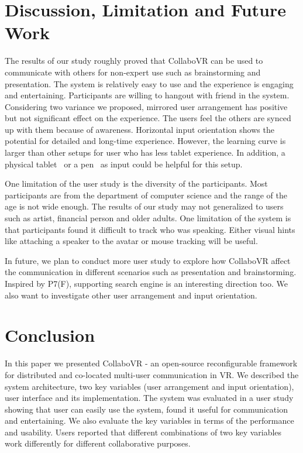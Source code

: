 \documentclass{sigchi}
\begin{document}
\section{Discussion, Limitation and Future Work}
The results of our study roughly proved that CollaboVR can be used to communicate with others for non-expert use such as brainstorming and presentation. The system is relatively easy to use and the experience is engaging and entertaining. Participants are willing to hangout with friend in the system. Considering two variance we proposed, mirrored user arrangement has positive but not significant effect on the experience. The users feel the others are synced up with them because of awareness. Horizontal input orientation shows the potential for detailed and long-time experience. However, the learning curve is larger than other setups for user who has less tablet experience. In addition, a physical tablet~\cite{sensel} or a pen~\cite{wu2017dodecapen} as input could be helpful for this setup. 

One limitation of the user study is the diversity of the participants. Most participants are from the department of computer science and the range of the age is not wide enough. The results of our study may not generalized to users such as artist, financial person and older adults. One limitation of the system is that participants found it difficult to track who was speaking. Either visual hints like attaching a speaker to the avatar or mouse tracking will be useful.

In future, we plan to conduct more user study to explore how CollaboVR affect the communication in different scenarios such as presentation and brainstorming. Inspired by P7(F), supporting search engine is an interesting direction too. We also want to investigate other user arrangement and input orientation.

\section{Conclusion}
In this paper we presented CollaboVR - an open-source reconfigurable framework for distributed and co-located multi-user communication in VR. We described the system architecture, two key variables (user arrangement and input orientation), user interface and its implementation. The system was evaluated in a user study showing that user can easily use the system, found it useful for communication and entertaining. We also evaluate the key variables in terms of the performance and usability. Users reported that different combinations of two key variables work differently for different collaborative purposes.
\end{document}
